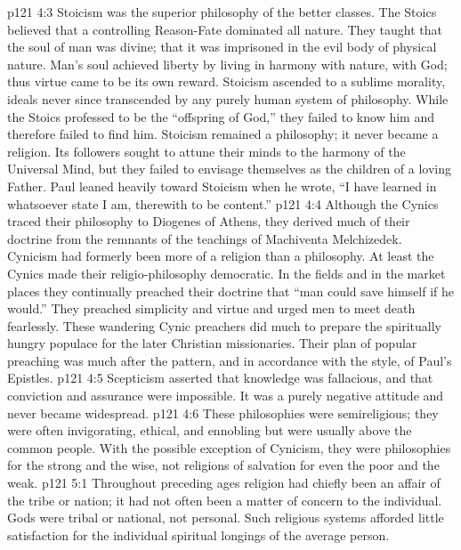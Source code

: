 \vs p121 4:3 \bibnobreakspace {} Stoicism was the superior philosophy of the better classes. The Stoics believed that a controlling Reason\hyp{}Fate dominated all nature. They taught that the soul of man was divine; that it was imprisoned in the evil body of physical nature. Man’s soul achieved liberty by living in harmony with nature, with God; thus virtue came to be its own reward. Stoicism ascended to a sublime morality, ideals never since transcended by any purely human system of philosophy. While the Stoics professed to be the “offspring of God,” they failed to know him and therefore failed to find him. Stoicism remained a philosophy; it never became a religion. Its followers sought to attune their minds to the harmony of the Universal Mind, but they failed to envisage themselves as the children of a loving Father. Paul leaned heavily toward Stoicism when he wrote, “I have learned in whatsoever state I am, therewith to be content.”
\vs p121 4:4 \bibnobreakspace {} Although the Cynics traced their philosophy to Diogenes of Athens, they derived much of their doctrine from the remnants of the teachings of Machiventa Melchizedek. Cynicism had formerly been more of a religion than a philosophy. At least the Cynics made their religio\hyp{}philosophy democratic. In the fields and in the market places they continually preached their doctrine that “man could save himself if he would.” They preached simplicity and virtue and urged men to meet death fearlessly. These wandering Cynic preachers did much to prepare the spiritually hungry populace for the later Christian missionaries. Their plan of popular preaching was much after the pattern, and in accordance with the style, of Paul’s Epistles.
\vs p121 4:5 \bibnobreakspace {} Scepticism asserted that knowledge was fallacious, and that conviction and assurance were impossible. It was a purely negative attitude and never became widespread.
\vs p121 4:6 \pc These philosophies were semireligious; they were often invigorating, ethical, and ennobling but were usually above the common people. With the possible exception of Cynicism, they were philosophies for the strong and the wise, not religions of salvation for even the poor and the weak.
\vs p121 5:1 Throughout preceding ages religion had chiefly been an affair of the tribe or nation; it had not often been a matter of concern to the individual. Gods were tribal or national, not personal. Such religious systems afforded little satisfaction for the individual spiritual longings of the average person.
